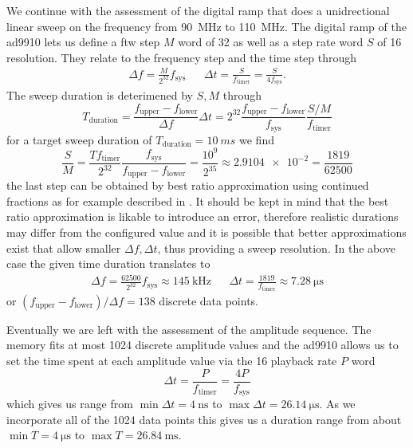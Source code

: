 We continue with the assessment of the digital ramp that does a unidrectional
linear sweep on the frequency from \SI{90}{\mega\hertz} to
\SI{110}{\mega\hertz}. The digital ramp of the \gls{ad9910} lets us define
a \gls{ftw} step $M$ word of \SI{32}{\bit} as well as a step rate word $S$ of
\SI{16}{\bit} resolution. They relate to the frequency step and the time
step through
\begin{align}
  \Delta f
  =
  \frac{M}{2^{32}}f_\text{sys}
  &&
  \Delta t
  =
  \frac{S}{f_\text{timer}}
  =
  \frac{S}{4f_\text{sys}}.
  \label{eq:elec:step}
\end{align}
The sweep duration is deterimened by $S,M$ through
\begin{equation}
  T_\text{duration}
  =
  \frac{f_\text{upper}-f_\text{lower}}{\Delta f}\Delta t
  =
  2^{32}\frac{f_\text{upper}-f_\text{lower}}{f_\text{sys}}\frac{S/M}{f_\text{timer}}
\end{equation}
for a target sweep duration of $T_\text{duration}=\SI{10}{ms}$ we find
\begin{equation*}
  \frac{S}{M}
  =
  \frac{T f_\text{timer}}{2^{32}}\frac{f_\text{sys}}{f_\text{upper}-f_\text{lower}}
  =
  \frac{10^9}{2^{35}}
  \approx
  \num{2.9104e-2}
  =
  \frac{1819}{62500}
\end{equation*}
the last step can be obtained by best ratio approximation using continued
fractions as for example described in \cite{Ashley2003}. It should be kept in
mind that the best ratio approximation is likable to introduce an error,
therefore realistic durations may differ from the configured value and it
is possible that better approximations exist that allow smaller $\Delta f,
\Delta t$, thus providing a sweep resolution. In the above case the given
time duration translates to
\begin{align*}
  \Delta f
  =
  \frac{62500}{2^{32}}f_\text{sys}
  \approx
  \SI{145}{\kilo\hertz}
  &&
  \Delta t
  =
  \frac{1819}{f_\text{timer}}
  \approx
  \SI{7.28}{\micro\second}
\end{align*}
or $(f_\text{upper}-f_\text{lower})/\Delta f=138$ discrete data points.

Eventually we are left with the assessment of the amplitude sequence. The
memory fits at most 1024 discrete amplitude values and the \gls{ad9910}
allows us to set the time spent at each amplitude value via the \SI{16}{\bit}
playback rate $P$ word
\begin{equation}
  \Delta t
  =
  \frac{P}{f_\text{timer}}
  =
  \frac{4P}{f_\text{sys}}
\end{equation}
which gives us range from $\min\Delta t=\SI{4}{\nano\second}$ to
$\max\Delta t=\SI{26.14}{\micro\second}$. As we incorporate all of the 1024
data points this gives us a duration range from about
$\min T=\SI{4}{\micro\second}$ to $\max T=\SI{26.84}{\milli\second}$.


